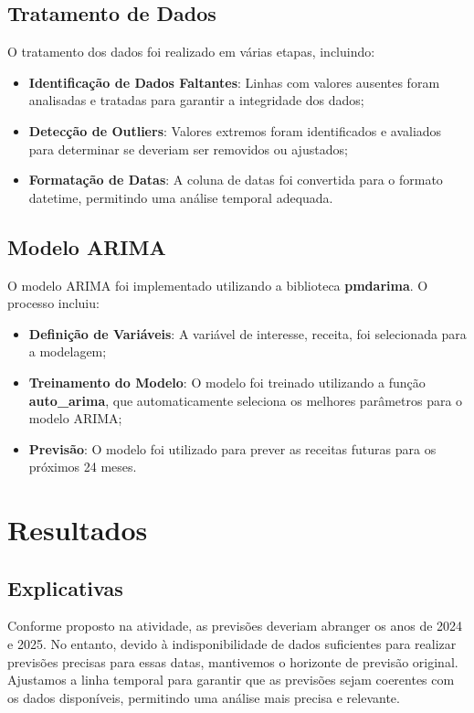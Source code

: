 \documentclass[a4paper,12pt]{article}
\begin{document}
\subsection{Tratamento de Dados}

O tratamento dos dados foi realizado em várias etapas, incluindo:

\begin{itemize}
    \item \textbf{Identificação de Dados Faltantes}: Linhas com valores ausentes foram analisadas e tratadas para garantir a integridade dos dados;
    \item \textbf{Detecção de Outliers}: Valores extremos foram identificados e avaliados para determinar se deveriam ser removidos ou ajustados;
    \item \textbf{Formatação de Datas}: A coluna de datas foi convertida para o formato datetime, permitindo uma análise temporal adequada.
\end{itemize}

\subsection{Modelo ARIMA}

O modelo ARIMA foi implementado utilizando a biblioteca \textbf{pmdarima}. O processo incluiu:

\begin{itemize}
    \item \textbf{Definição de Variáveis}: A variável de interesse, receita, foi selecionada para a modelagem;
    \item \textbf{Treinamento do Modelo}: O modelo foi treinado utilizando a função \textbf{auto\_arima}, que automaticamente seleciona os melhores parâmetros para o modelo ARIMA;
    \item \textbf{Previsão}: O modelo foi utilizado para prever as receitas futuras para os próximos 24 meses.
\end{itemize}

\section{Resultados}
\subsection{Explicativas}
Conforme proposto na atividade, as previsões deveriam abranger os anos de 2024 e 2025. No entanto, devido à indisponibilidade de dados suficientes para realizar previsões precisas para essas datas, mantivemos o horizonte de previsão original. Ajustamos a linha temporal para garantir que as previsões sejam coerentes com os dados disponíveis, permitindo uma análise mais precisa e relevante.
\end{document}
